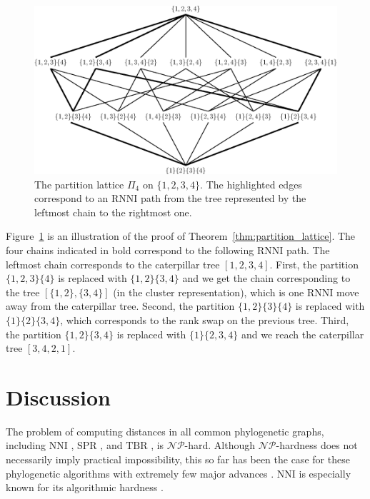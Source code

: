 \documentclass{amsart}
\newcommand{\np}{\mathcal{NP}}
\newcommand{\nni}{\mathrm{NNI}}
\newcommand{\rnni}{\mathrm{RNNI}}
\newcommand{\tbr}{\mathrm{TBR}}
\newcommand{\spr}{\mathrm{SPR}}
\begin{document}
\begin{figure}[H]
\centering
\includegraphics[width=\textwidth]{partition_lattice4}
\vspace{12pt}
\caption{The partition lattice $\Pi_4$ on $\{1,2,3,4\}$.
The highlighted edges correspond to an $\rnni$ path from the tree represented by the leftmost chain to the rightmost one.}
\label{fig:partition_lattice4}
\end{figure}

Figure~\ref{fig:partition_lattice4} is an illustration of the proof of Theorem~\ref{thm:partition_lattice}.
The four chains indicated in bold correspond to the following $\rnni$ path.
The leftmost chain corresponds to the caterpillar tree $[1, 2, 3, 4]$.
First, the partition $\{1, 2, 3\} \{4\}$ is replaced with $\{1, 2\} \{3, 4\}$ and we get the chain corresponding to the tree $[\{1, 2\}, \{3, 4\}]$ (in the cluster representation), which is one $\rnni$ move away from the caterpillar tree.
Second, the partition $\{1, 2\} \{3\} \{4\}$ is replaced with $\{1\} \{2\} \{3, 4\}$, which corresponds to the rank swap on the previous tree.
Third, the partition $\{1, 2\} \{3, 4\}$ is replaced with $\{1\} \{2, 3, 4\}$ and we reach the caterpillar tree $[3, 4, 2, 1]$.


\section{Discussion}

The problem of computing distances in all common phylogenetic graphs, including $\nni$ \autocite{Dasgupta2000-xa}, $\spr$ \autocite{Bordewich2005-nx}, and $\tbr$ \autocite{Allen2001-ky}, is $\np$-hard.
Although $\np$-hardness does not necessarily imply practical impossibility, this so far has been the case for these phylogenetic algorithms with extremely few major advances \autocite{Whidden2010-bw}.
$\nni$ is especially known for its algorithmic hardness \autocite{Whidden2018-fw}.
\end{document}
